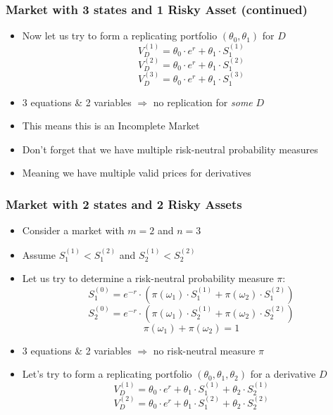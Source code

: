\documentclass{beamer}
\begin{document}
\begin{frame}
\frametitle{Market with 3 states and 1 Risky Asset (continued)}
\begin{itemize}
\item Now let us try to form a replicating portfolio $(\theta_0, \theta_1)$ for $D$
$$V_D^{(1)} = \theta_0 \cdot e^r + \theta_1 \cdot S_1^{(1)}$$
$$V_D^{(2)} = \theta_0 \cdot e^r + \theta_1 \cdot S_1^{(2)}$$ 
$$V_D^{(3)} = \theta_0 \cdot e^r + \theta_1 \cdot S_1^{(3)}$$
\item 3 equations \& 2 variables $\Rightarrow$ no replication for {\em some} $D$
\item This means this is an Incomplete Market 
\item Don't forget that we have multiple risk-neutral probability measures
\item Meaning we have multiple valid prices for derivatives
\end{itemize}
\end{frame}

\begin{frame}
\frametitle{Market with 2 states and 2 Risky Assets}
\begin{itemize}
\item Consider a market with $m = 2$ and $n = 3$
\item Assume $S_1^{(1)} < S_1^{(2)}$ and $S_2^{(1)} < S_2^{(2)}$
\item Let us try to determine a risk-neutral probability measure $\pi$:
$$S_1^{(0)} = e^{-r} \cdot (\pi(\omega_1) \cdot S_1^{(1)} + \pi(\omega_2) \cdot S_1^{(2)})$$
$$S_2^{(0)} = e^{-r} \cdot (\pi(\omega_1) \cdot S_2^{(1)} + \pi(\omega_2) \cdot S_2^{(2)})$$
$$\pi(\omega_1) + \pi(\omega_2) = 1$$
\item 3 equations \& 2 variables $\Rightarrow$ no risk-neutral measure $\pi$
\item Let's try to form a replicating portfolio $(\theta_0, \theta_1, \theta_2)$ for a derivative $D$
$$V_D^{(1)} = \theta_0 \cdot e^r + \theta_1 \cdot S_1^{(1)} + \theta_2 \cdot S_2^{(1)}$$
$$V_D^{(2)} = \theta_0 \cdot e^r + \theta_1 \cdot S_1^{(2)} + \theta_2 \cdot S_2^{(2)}$$
\end{itemize}
\end{frame}
\end{document}
